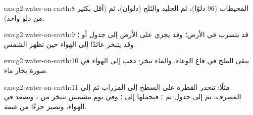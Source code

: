 \begin{solution}{exo:g2:water-on-earth:8}
المحيطات (96 دلوًا)، ثم الجليد والثلج (دلوان)، ثم  (أقل بكثير
من دلو واحد).
\end{solution}

\begin{solution}{exo:g2:water-on-earth:9}
قد يتسرب في الأرض؛ وقد يجري على الأرض إلى جدول أو ؛ وقد يتبخر
عائدًا إلى الهواء حين تظهر الشمس.
\end{solution}

\begin{solution}{exo:g2:water-on-earth:10}
يبقى الملح في قاع الوعاء. والماء تبخر: ذهب إلى الهواء في صورة بخار
ماء.
\end{solution}

\begin{solution}{exo:g2:water-on-earth:11}
مثلًا: تنحدر القطرة على السطح إلى المزراب ثم إلى المصرف، ثم إلى جدول
ثم ؛ فيحملها  إلى ؛ وفي يوم مشمس تتبخر من ، وتصعد في
الهواء، وتصير جزءًا من غيمة.
\end{solution}
